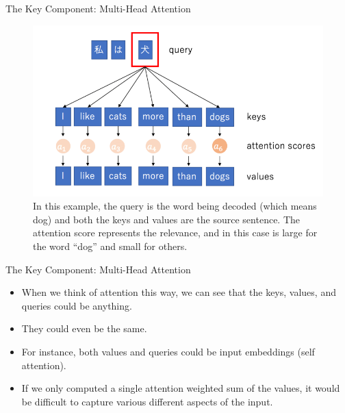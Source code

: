 \documentclass[handout]{beamer}
\begin{document}
\begin{frame}{The Key Component: Multi-Head Attention}

    \begin{figure}[h]
        	\includegraphics[scale = 0.28]{pics/attention_concept.png}
        	\caption{In this example, the query is the word being decoded (which means dog) and both the keys and values are the source sentence. The attention score represents the relevance, and in this case is large for the word “dog” and small for others.}
        \end{figure}  

\end{frame}




\begin{frame}{The Key Component: Multi-Head Attention}
\begin{scriptsize}
\begin{itemize}
 \item When we think of attention this way, we can see that the keys, values, and queries could be anything. 
 \item They could even be the same. 
 \item For instance, both values and queries could be input embeddings (self attention). 
 
 \item If we only computed a single attention weighted sum of the values, it would be difficult to capture various different aspects of the input.
 

\end{itemize}

\end{scriptsize}

\end{frame}
\end{document}
